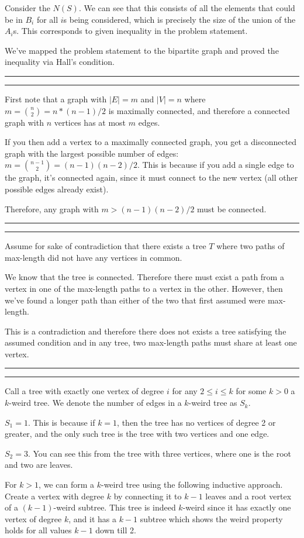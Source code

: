 \documentclass[11pt,letterpaper]{article}
\newcommand{\question}[1] {\vspace{.25in} \hrule\vspace{0.5em}
\noindent{\bf #1} \vspace{0.5em}
\hrule \vspace{.10in}}
\begin{document}
Consider the $N(S)$. We can see that this consists of all the elements that could be in $B_i$ for all $i$s being considered,
which is precisely the size of the union of the $A_i$s. This corresponds to given inequality in the problem statement.

We've mapped the problem statement to the bipartite graph and proved the inequality via Hall's condition.


\question{3}
First note that a graph with $|E| = m$ and $|V| = n$ where $m = {n \choose 2} = n*(n - 1)/2$ is maximally connected, and therefore a connected graph with $n$ vertices has at most $m$ edges.

If you then add a vertex to a maximally connected graph, you get a disconnected graph with the largest possible number of edges: $m = {n-1 \choose 2} = (n-1)(n-2)/2$.
This is because if you add a single edge to the graph, it's connected again, since it must connect to the new vertex (all other possible edges already exist).

Therefore, any graph with $m > (n-1)(n-2)/2$ must be connected.

\question{4}
Assume for sake of contradiction that there exists a tree $T$ where two paths of max-length did not have any vertices in common.

We know that the tree is connected.
Therefore there must exist a path from a vertex in one of the max-length paths to a vertex in the other.
However, then we've found a longer path than either of the two that first assumed were max-length.

This is a contradiction and therefore there does not exists a tree satisfying the assumed condition and in any tree, two max-length paths must share at least one vertex.

\question{5}
Call a tree with exactly one vertex of degree $i$ for any $2 \leq i \leq k$ for some $k > 0$ a $k$-weird tree.
We denote the number of edges in a $k$-weird tree as $S_k$.

$S_1 = 1$. This is because if $k=1$, then the tree has no vertices of degree 2 or greater, and the only such tree is the tree with two vertices and one edge.

$S_2 = 3$. You can see this from the tree with three vertices, where one is the root and two are leaves.

For $k>1$, we can form a $k$-weird tree using the following inductive approach. Create a vertex with degree $k$ by connecting it to $k-1$ leaves and a root vertex of a $(k-1)$-weird subtree.
This tree is indeed $k$-weird since it has exactly one vertex of degree $k$, and it has a $k-1$ subtree which shows the weird property holds for all values $k-1$ down till 2.
\end{document}
